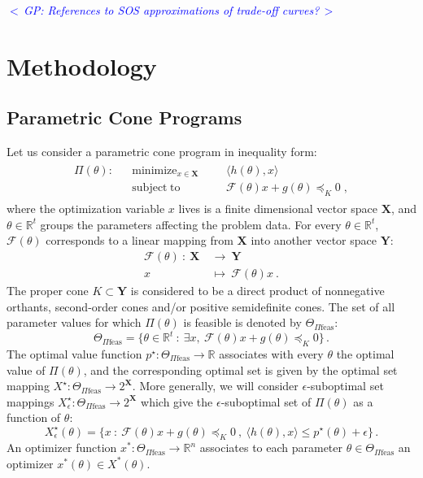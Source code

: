 \documentclass{article}
\newcommand{\R}{\mathbb{R}}        %
\newcommand{\ppar}{\theta}                  %
\newcommand{\Ppar}{\Theta}                  %
\newcommand{\X}{\mathbf{X}}
\newcommand{\Y}{\mathbf{Y}}
\newcommand{\calF}{\mathcal{F}}
\newcommand{\Pfeas}{\Pi \text{feas}}
\DeclareMathOperator*{\minimize}{minimize}
\DeclareMathOperator*{\subj}{subject\;to}
\newcommand{\commentGP}[1]{\noindent \textcolor{blue}{\emph{$<\,$GP: #1$\,>$}}}%
\begin{document}
\commentGP{References to SOS approximations of trade-off curves?}



\section{Methodology}\label{sec:methodology}


\subsection{Parametric Cone Programs}\label{subsec:parametric_program}

Let us consider a parametric cone program in inequality form:
\begin{gather}\label{eq:parametric_primal}
\begin{aligned}
\Pi(\ppar): && \minimize_{x\in\X} &&& \langle h(\ppar), x \rangle\\
            && \subj              &&& \calF(\ppar)x +g(\ppar)\preceq_K 0 \;,%
\end{aligned}
\end{gather}
where the optimization variable $x$ lives is a finite dimensional vector space $\X$, and $\ppar\in\R^t$ groups the parameters affecting the problem data. For every $\ppar\in\R^t$, $\calF(\ppar)$ corresponds to a linear mapping from $\X$ into another vector space $\Y$:
\begin{align*}
\calF(\ppar) ~:~ \X~ &\rightarrow~ \Y \\
                  x~ &\mapsto~ \calF(\ppar)x ~.
\end{align*}
The proper cone $K\subset\Y$ is considered to be a direct product of nonnegative orthants, second-order cones and/or positive semidefinite cones. The set of all parameter values for which $\Pi(\ppar)$ is feasible is denoted by $\Ppar_{\Pfeas}$:
\[ \Ppar_{\Pfeas} = \{\ppar\in\R^t ~:~ \exists x ,~ \calF(\ppar)x+g(\ppar)\preceq_K 0 \}\,.%
\]
The optimal value function $p^\star:\Ppar_{\Pfeas}\rightarrow\R$ associates with every $\ppar$ the optimal value of $\Pi(\ppar)$, and the corresponding optimal set is given by the optimal set mapping $X^\star:\Ppar_{\Pfeas}\rightarrow 2^{\X}$. More generally, we will consider $\epsilon$-suboptimal set mappings $X_\epsilon^\star:\Ppar_{\Pfeas}\rightarrow 2^{\X}$ which give the $\epsilon$-suboptimal set of $\Pi(\ppar)$ as a function of $\ppar$:
\[ X^\star_\epsilon(\ppar) = \{x ~:~ \calF(\ppar)x+g(\ppar)\preceq_K 0 ~,~ \langle h(\ppar), x \rangle \leq p^\star(\ppar)+\epsilon\} \,.%
\]
An optimizer function $x^*:\Ppar_{\Pfeas}\rightarrow\R^n$ associates to each parameter $\ppar\in\Ppar_{\Pfeas}$ an optimizer $x^*(\ppar)\in X^*(\ppar)$.
\end{document}
